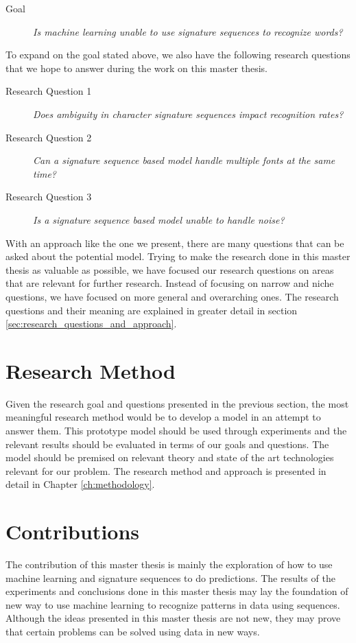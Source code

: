 \begin{description}
    \item[Goal]{\textit{Is machine learning unable to use signature sequences to recognize words?}}
\end{description}

To expand on the goal stated above, we also have the following research questions that we hope to answer during the work on this master thesis.

\begin{description}
    \item[Research Question 1]{\textit{Does ambiguity in character signature sequences impact recognition rates?}}
    \item[Research Question 2]{\textit{Can a signature sequence based model handle multiple fonts at the same time?}}
    \item[Research Question 3]{\textit{Is a signature sequence based model unable to handle noise?}}
\end{description}

With an approach like the one we present, there are many questions that can be asked about the potential model. Trying to make the research done in this master thesis as valuable as possible, we have focused our research questions on areas that are relevant for further research. Instead of focusing on narrow and niche questions, we have focused on more general and overarching ones. The research questions and their meaning are explained in greater detail in section \ref{sec:research_questions_and_approach}.


\section{Research Method}
Given the research goal and questions presented in the previous section, the most meaningful research method would be to develop a model in an attempt to answer them. This prototype model should be used through experiments and the relevant results should be evaluated in terms of our goals and questions. The model should be premised on relevant theory and state of the art technologies relevant for our problem. The research method and approach is presented in detail in Chapter \ref{ch:methodology}.


\section{Contributions}
The contribution of this master thesis is mainly the exploration of how to use machine learning and signature sequences to do predictions. The results of the experiments and conclusions done in this master thesis may lay the foundation of new way to use machine learning to recognize patterns in data using sequences. Although the ideas presented in this master thesis are not new, they may prove that certain problems can be solved using data in new ways.

